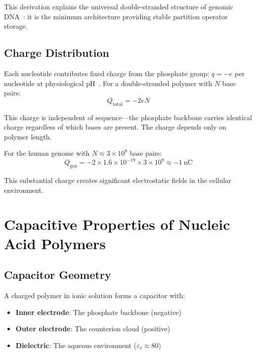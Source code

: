 \documentclass[twocolumn,aps,prb,superscriptaddress,longbibliography,floatfix]{revtex4-2}
\theoremstyle{remark}
\newcommand{\Qgen}{Q_\text{gen}}
\begin{document}
This derivation explains the universal double-stranded structure of
genomic DNA~\cite{Watson1953}: it is the minimum architecture providing
stable partition operator storage.

\subsection{Charge Distribution}

Each nucleotide contributes fixed charge from the phosphate group:
$q = -e$ per nucleotide at physiological pH~\cite{Manning1978}. For a
double-stranded polymer with $N$ base pairs:
\begin{equation}
Q_\text{total} = -2eN
\label{eq:dna_charge}
\end{equation}

This charge is independent of sequence---the phosphate backbone carries
identical charge regardless of which bases are present. The charge
depends only on polymer length.

For the human genome with $N \approx 3 \times 10^9$ base pairs:
\begin{equation}
\Qgen = -2 \times 1.6 \times 10^{-19} \times 3 \times 10^9 \approx -1~\text{nC}
\label{eq:genome_charge}
\end{equation}

This substantial charge creates significant electrostatic fields in the
cellular environment.

\section{Capacitive Properties of Nucleic Acid Polymers}
\label{sec:capacitance}

\subsection{Capacitor Geometry}

A charged polymer in ionic solution forms a capacitor with:
\begin{itemize}
    \item \textbf{Inner electrode}: The phosphate backbone (negative)
    \item \textbf{Outer electrode}: The counterion cloud (positive)
    \item \textbf{Dielectric}: The aqueous environment ($\varepsilon_r \approx 80$)
\end{itemize}
\end{document}
